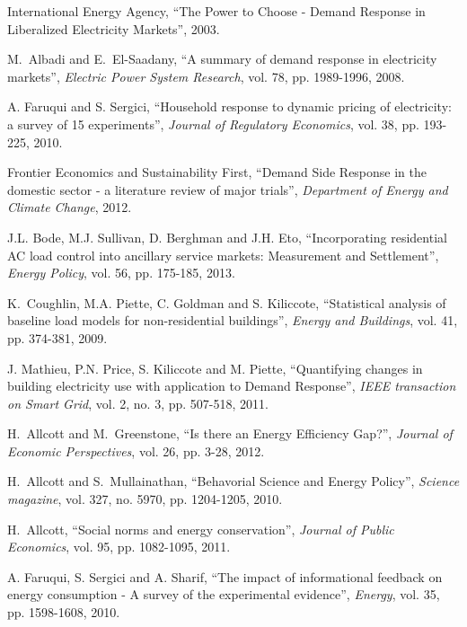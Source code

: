 \documentclass[journal]{IEEEtran}
\begin{document}
\begin{thebibliography}{1}

International Energy Agency, ``The Power to Choose - Demand Response in Liberalized Electricity Markets'', 2003.

M.~Albadi and E.~El-Saadany, ``A summary of demand response in electricity markets'', \emph{Electric Power System Research}, vol. 78, pp. 1989-1996, 2008.

A. Faruqui and S. Sergici, ``Household response to dynamic pricing of electricity: a survey of 15 experiments'', \emph{Journal of Regulatory Economics}, vol. 38, pp. 193-225, 2010.

Frontier Economics and Sustainability First, ``Demand Side Response in the domestic sector - a literature review of major trials'',  \emph{Department of Energy and Climate Change}, 2012.

J.L. Bode, M.J. Sullivan, D. Berghman and J.H. Eto, ``Incorporating residential AC load control into ancillary service markets: Measurement and Settlement'', \emph{Energy Policy}, vol. 56, pp. 175-185, 2013.

K.~Coughlin, M.A. Piette, C. Goldman and S. Kiliccote, ``Statistical analysis of baseline load models for non-residential buildings'', \emph{Energy and Buildings}, vol. 41, pp. 374-381, 2009.

J. Mathieu, P.N. Price, S. Kiliccote and M. Piette, ``Quantifying changes in building electricity use with application to Demand Response'', \emph{IEEE transaction on Smart Grid}, vol. 2, no. 3, pp. 507-518, 2011.

H.~Allcott and M.~Greenstone, ``Is there an Energy Efficiency Gap?'', \emph{Journal of Economic Perspectives}, vol. 26, pp. 3-28, 2012.

H.~Allcott and S.~Mullainathan, ``Behavorial Science and Energy Policy'', \emph{Science magazine}, vol. 327, no. 5970, pp. 1204-1205, 2010.

H.~Allcott, ``Social norms and energy conservation'', \emph{Journal of Public Economics}, vol. 95, pp. 1082-1095, 2011.

A. Faruqui, S. Sergici and A. Sharif, ``The impact of informational feedback on energy consumption - A survey of the experimental evidence'', \emph{Energy}, vol. 35, pp. 1598-1608, 2010.


\end{thebibliography}
\end{document}
